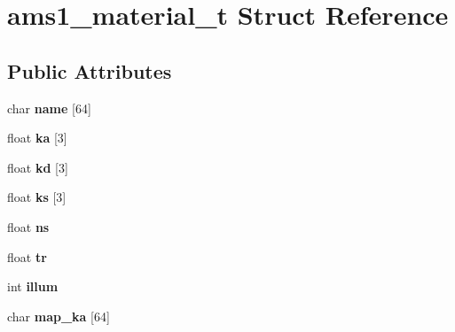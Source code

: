 \hypertarget{structams1__material__t}{}\section{ams1\+\_\+material\+\_\+t Struct Reference}
\label{structams1__material__t}
\subsection*{Public Attributes}
\begin{DoxyCompactItemize}
\item 
\mbox{\label{structams1__material__t_a24cc8679af561982ec51e7642d9ee72f}} 
char {\bfseries name} \mbox{[}64\mbox{]}
\item 
\mbox{\label{structams1__material__t_aa76d5b7a07073779a456d1c32c780e6b}} 
float {\bfseries ka} \mbox{[}3\mbox{]}
\item 
\mbox{\label{structams1__material__t_ad5a7a3e2d18a024f2f9e9d353ecc2ffb}} 
float {\bfseries kd} \mbox{[}3\mbox{]}
\item 
\mbox{\label{structams1__material__t_a580650503b53c6680f6d09721aa32b11}} 
float {\bfseries ks} \mbox{[}3\mbox{]}
\item 
\mbox{\label{structams1__material__t_af168f67dc164204aeeb3de2f6cde36a4}} 
float {\bfseries ns}
\item 
\mbox{\label{structams1__material__t_aa3895db748b17b63682c72f28f57fbdb}} 
float {\bfseries tr}
\item 
\mbox{\label{structams1__material__t_af99ddcbb9baddfcbc01e6b3bbb7cccf9}} 
int {\bfseries illum}
\item 
\mbox{\label{structams1__material__t_a4f2583a125aae3585e51f82bb1edc4ee}} 
char {\bfseries map\+\_\+ka} \mbox{[}64\mbox{]}
\item 
\mbox{\label{structams1__material__t_a5291a41618fa205f693510cacd3eec9f}} 

\end{DoxyCompactItemize}
